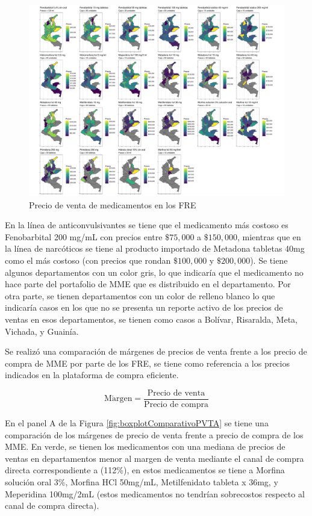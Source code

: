 \documentclass[
]{book}
\begin{document}
\begin{figure}[t!]
\includegraphics[width=1\linewidth]{InformeFinal_files/figure-latex/precioVentasDepartamentos-1} \caption{Precio de venta de medicamentos en los FRE}\label{fig:precioVentasDepartamentos}
\end{figure}

En la línea de anticonvulsivantes se tiene que el medicamento más costoso es Fenobarbital 200 mg/mL con precios entre \(\$75,000\) a \(\$150,000\), mientras que en la línea de narcóticos se tiene al producto importado de Metadona tabletas 40mg como el más costoso (con precios que rondan \(\$100,000\) y \(\$200,000\)). Se tiene algunos departamentos con un color gris, lo que indicaría que el medicamento no hace parte del portafolio de MME que es distribuido en el departamento. Por otra parte, se tienen departamentos con un color de relleno blanco lo que indicaría casos en los que no se presenta un reporte activo de los precios de ventas en esos departamentos, se tienen como casos a Bolívar, Risaralda, Meta, Vichada, y Guainía.

Se realizó una comparación de márgenes de precios de venta frente a los precio de compra de MME por parte de los FRE, se tiene como referencia a los precios indicados en la plataforma de compra eficiente.

\[\mathrm{M\acute{a}rgen} = \frac{\text{Precio de venta}}{\text{Precio de compra}}\]

En el panel A de la Figura \ref{fig:boxplotComparativoPVTA} se tiene una comparación de los márgenes de precio de venta frente a precio de compra de los MME. En verde, se tienen los medicamentos con una mediana de precios de ventas en departamentos menor al margen de venta mediante el canal de compra directa correspondiente a (112\%), en estos medicamentos se tiene a Morfina solución oral 3\%, Morfina HCl 50mg/mL, Metilfenidato tableta x 36mg, y Meperidina 100mg/2mL (estos medicamentos no tendrían sobrecostos respecto al canal de compra directa).
\end{document}
